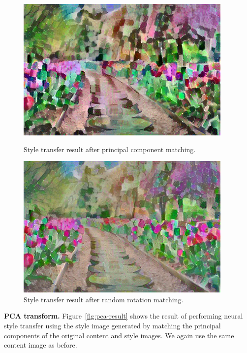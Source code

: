 \documentclass[10pt,twocolumn,letterpaper]{article}
\begin{document}
\begin{figure}[ht]
\centering
\begin{minipage}{0.48\linewidth}
\centering
\includegraphics[width=\linewidth]{imgs/flowers-rgb-pca.jpg}
\caption{Style transfer result after principal component matching.}
\label{fig:pca-result}
\end{minipage}
\quad
\begin{minipage}{0.48\linewidth}
\centering
\includegraphics[width=\linewidth]{imgs/flowers-rgb-rot.jpg}
\caption{Style transfer result after random rotation matching.}
\label{fig:rot-result}
\end{minipage}
\end{figure}

\bigbreak\noindent\textbf{PCA transform.}
Figure~\ref{fig:pca-result} shows the result of performing neural style transfer using the style image generated by matching the principal components of the original content and style images. We again use the same content image as before.
\end{document}
